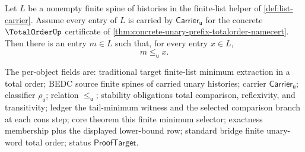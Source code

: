 \begin{theorem}
\label{thm:totalorder-prefix-finite-minimum-selector}
Let $L$ be a nonempty finite spine of histories in the finite-list helper of
\autoref{def:list-carrier}. Assume every entry of $L$ is carried by
$\mathsf{Carrier}_{\mathsf{u}}$ for the concrete $\TotalOrderUp$ certificate of
\autoref{thm:concrete-unary-prefix-totalorder-namecert}. Then there is an entry
$m\in L$ such that, for every entry $x\in L$,
$$
m\le_{\mathsf{u}}x.
$$

The per-object fields are: traditional target finite-list minimum extraction in
a total order; BEDC source finite spines of carried unary histories; carrier
$\mathsf{Carrier}_{\mathsf{u}}$; classifier $\rho_{\mathsf{u}}$; relation
$\le_{\mathsf{u}}$; stability obligations total comparison, reflexivity, and
transitivity; ledger the tail-minimum witness and the selected comparison branch
at each cons step; core theorem this finite minimum selector; exactness
membership plus the displayed lower-bound row; standard bridge finite unary-word
total order; status $\mathsf{ProofTarget}$.
\end{theorem}
